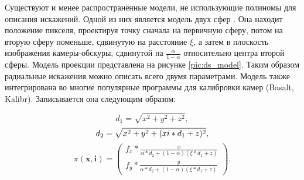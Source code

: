 Существуют и менее распространённые модели, не использующие полиномы для описания искажений. Одной из них является
модель двух сфер \cite{double_sphere}. 
Она находит положение пикселя, проектируя точку сначала на первичную сферу, потом на вторую сферу поменьше, сдвинутую на 
расстояние $\xi$, а затем в плоскость изображения камеры-обскуры, сдвинутой на $\frac{\alpha}{1-\alpha}$ относительно 
центра второй сферы. Модель проекции представлена на рисунке \ref{pic:ds_model}. Таким образом радиальные искажения 
можно описать всего двумя параметрами. Модель также интегрирована
во многие популярные программы для калибровки камер (Basalt, Kalibr). Записывается она следующим образом:
\begin{eqseries}
    \begin{equation}	
        d_1 = \sqrt{x^2+y^2+z^2}, 
    \end{equation}
    \begin{equation}	
        d_2 = \sqrt{x^2+y^2+(\\xi*d_1+z)^2 }, 
    \end{equation}
    \begin{equation}	
        \pi(\mathbf{x}, \mathbf{i}) = \begin{pmatrix}f_x * \frac{x}{\alpha*d_2+(1-\alpha)(\xi*d_1+z)} \\
                                                    f_y * \frac{y}{\alpha*d_2+(1-\alpha)(\xi*d_1+z)} \end{pmatrix}.
        \label{eqn:ds}
    \end{equation}
\end{eqseries}


